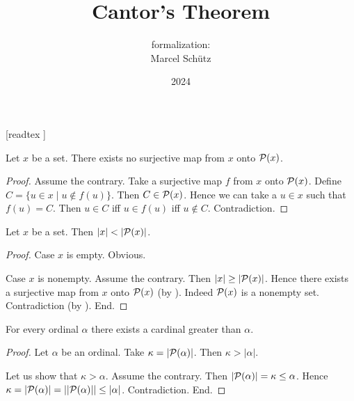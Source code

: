 \documentclass{article}
\title{Cantor's Theorem}
\author{\Naproche formalization: \vspace{0.5em} \\
Marcel Schütz}
\date{2024}
\begin{document}
  \maketitle

  \begin{imports}
    \begin{forthel}
      [readtex ]
    \end{forthel}
  \end{imports}

  \begin{forthel}
    \begin{theorem*}\label{cantor}
      Let $x$ be a set.
      There exists no surjective map from $x$ onto $\mathcal{P}(x)$.
    \end{theorem*}
    \begin{proof}
      Assume the contrary.
      Take a surjective map $f$ from $x$ onto $\mathcal{P}(x)$.
      Define $C = \{ u \in x \mid u \notin f(u) \}$.
      Then $C \in \mathcal{P}(x)$.
      Hence we can take a $u \in x$ such that $f(u) = C$.
      Then $u \in C$ iff $u \in f(u)$ iff $u \notin C$.
      Contradiction.
    \end{proof}
  \end{forthel}
  
  \begin{forthel}
    \begin{corollary*}
      Let $x$ be a set.
      Then $|x| < |\mathcal{P}(x)|$.
    \end{corollary*}
    \begin{proof}
      Case $x$ is empty. Obvious.

      Case $x$ is nonempty.
        Assume the contrary.
        Then $|x| \geq |\mathcal{P}(x)|$.
        Hence there exists a surjective map from $x$ onto $\mathcal{P}(x)$ (by ).
        Indeed $\mathcal{P}(x)$ is a nonempty set.
        Contradiction (by ).
      End.
    \end{proof}
  \end{forthel}

  \begin{forthel}
    \begin{corollary*}
      For every ordinal $\alpha$ there exists a cardinal greater than $\alpha$.
    \end{corollary*}
    \begin{proof}
      Let $\alpha$ be an ordinal.
      Take $\kappa = |\mathcal{P}(\alpha)|$.
      Then $\kappa > |\alpha|$.

      Let us show that $\kappa > \alpha$.
        Assume the contrary.
        Then $|\mathcal{P}(\alpha)|
          = \kappa
          \leq \alpha$.
        Hence $\kappa
          = |\mathcal{P}(\alpha)|
          = ||\mathcal{P}(\alpha)||
          \leq |\alpha|$.
        Contradiction.
      End.
    \end{proof}
  \end{forthel}
\end{document}
